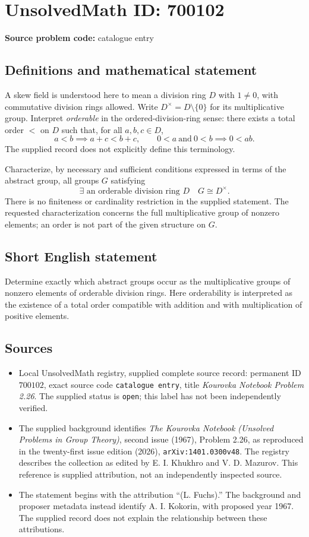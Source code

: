 \documentclass[11pt]{article}
\begin{document}
\section*{UnsolvedMath ID: 700102}
\textbf{Source problem code:} catalogue entry
\subsection{Definitions and mathematical statement}
A skew field is understood here to mean a division ring \(D\) with \(1\ne 0\), with commutative division rings allowed. Write \(D^{\times}=D\setminus\{0\}\) for its multiplicative group. Interpret \emph{orderable} in the ordered-division-ring sense: there exists a total order \(<\) on \(D\) such that, for all \(a,b,c\in D\),
\[
a<b\implies a+c<b+c,
\qquad
0<a\ \text{and}\ 0<b\implies 0<ab.
\]
The supplied record does not explicitly define this terminology.

Characterize, by necessary and sufficient conditions expressed in terms of the abstract group, all groups \(G\) satisfying
\[
\exists\text{ an orderable division ring }D\quad G\cong D^{\times}.
\]
There is no finiteness or cardinality restriction in the supplied statement. The requested characterization concerns the full multiplicative group of nonzero elements; an order is not part of the given structure on \(G\).
\subsection{Short English statement}
Determine exactly which abstract groups occur as the multiplicative groups of nonzero elements of orderable division rings. Here orderability is interpreted as the existence of a total order compatible with addition and with multiplication of positive elements.
\subsection{Sources}
\begin{itemize}
\item Local UnsolvedMath registry, supplied complete source record: permanent ID \(700102\), exact source code \texttt{catalogue entry}, title \emph{Kourovka Notebook Problem 2.26}. The supplied status is \texttt{open}; this label has not been independently verified.
\item The supplied background identifies \emph{The Kourovka Notebook (Unsolved Problems in Group Theory)}, second issue (1967), Problem 2.26, as reproduced in the twenty-first issue edition (2026), \texttt{arXiv:1401.0300v48}. The registry describes the collection as edited by E. I. Khukhro and V. D. Mazurov. This reference is supplied attribution, not an independently inspected source.
\item The statement begins with the attribution ``(L. Fuchs).'' The background and proposer metadata instead identify A. I. Kokorin, with proposed year 1967. The supplied record does not explain the relationship between these attributions.
\end{itemize}
\end{document}
